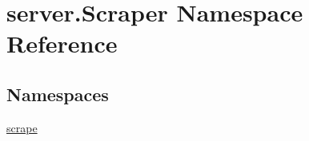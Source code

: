 \hypertarget{namespaceserver_1_1_scraper}{}\section{server.\+Scraper Namespace Reference}
\label{namespaceserver_1_1_scraper}
\subsection*{Namespaces}
\begin{DoxyCompactItemize}
\item 
 \mbox{\hyperlink{namespaceserver_1_1_scraper_1_1scrape}{scrape}}
\end{DoxyCompactItemize}
